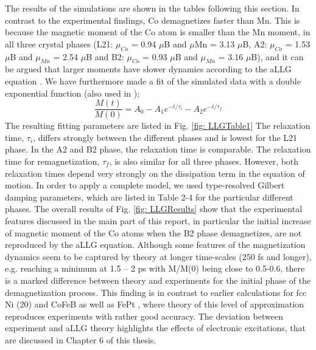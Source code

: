 The results of the simulations are shown in the tables following this section. In contrast to the experimental findings, Co demagnetizes faster than Mn. This is because the magnetic moment of the Co atom is smaller than the Mn moment, in all three crystal phases (L21: $\mu_{Co}$ = 0.94 $\mu$B and $\mu$Mn = 3.13 $\mu$B, A2: $\mu_{Co}$ = 1.53 $\mu$B and $\mu_{Mn}$ = 2.54 $\mu$B and B2: $\mu_{Co}$ = 0.93 $\mu$B and $\mu_{Mn}$ = 3.16 $\mu$B), and it can be argued that larger moments have slower dynamics according to the aLLG equation \cite{Mentink2012}. We have furthermore made a fit of the simulated data with a double exponential function (also used in \cite{Malinowski2008});
\begin{equation}
\frac{M(t)}{M(0)}=A_0-A_1e^{-t/\tau_i}-A_2e^{-t/\tau_f}
\end{equation}
The resulting fitting parameters are listed in Fig. \ref{fig: LLGTable1} The relaxation time, $\tau_i$, differs strongly between the different phases and is lowest for the L21 phase. In the A2 and B2 phase, the relaxation time is comparable. The relaxation time for remagnetization, $\tau_f$, is also similar for all three phases. However, both relaxation times depend very strongly on the dissipation term in the equation of motion. In order to apply a complete model, we used type-resolved Gilbert damping parameters, which are listed in Table 2-4 for the particular different phases. The overall results of Fig. \ref{fig: LLGResults} show that the experimental features discussed in the main part of this report, in particular the initial increase of magnetic moment of the Co atoms when the B2 phase demagnetizes, are not reproduced by the aLLG equation. Although some features of the magnetization dynamics seem to be captured by theory at longer time-scales (250 fs and longer), e.g. reaching a minimum at 1.5 – 2 ps with M/M(0) being close to 0.5-0.6, there is a marked difference between theory and experiments for the initial phase of the demagnetization process. This finding is in contrast to earlier calculations for fcc Ni (20) and CoFeB as well as FePt \cite{Hofherr2018}, where theory of this level of approximation reproduces experiments with rather good accuracy. The deviation between experiment and aLLG theory highlights the effects of electronic excitations, that are discussed in Chapter 6 of this thesis.  

